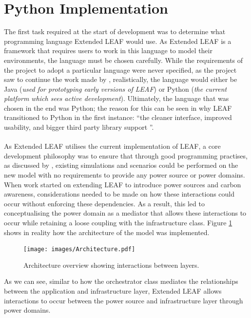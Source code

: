 \documentclass{l4proj}
\begin{document}
\section{Python Implementation}\label{sec:python}
The first task required at the start of development was to determine what programming language Extended LEAF would use.
As Extended LEAF is a framework that requires users to work in this language to model their environments, the language must be chosen carefully.
While the requirements of the project to adopt a particular language were never specified, as the project saw to continue the work made by \cite{leaf2021}, realistically, the language would either be Java (\textit{used for prototyping early versions of LEAF}) or Python (\textit{the current platform which sees active development}).
Ultimately, the language that was chosen in the end was Python; the reason for this can be seen in why LEAF transitioned to Python in the first instance: ``the cleaner interface, improved usability, and bigger third party library support \citep{leaf-java-git}''.\\ \\
As Extended LEAF utilises the current implementation of LEAF, a core development philosophy was to ensure that through good programming practises, as discussed by \citep{looseCoupling}, existing simulations and scenarios could be performed on the new model with no requirements to provide any power source or power domains.
When work started on extending LEAF to introduce power sources and carbon awareness, considerations needed to be made on how these interactions could occur without enforcing these dependencies.
As a result, this led to conceptualising the power domain as a mediator that allows these interactions to occur while retaining a loose coupling with the infrastructure class.
Figure \ref{fig:archtecture} shows in reality how the architecture of the model was implemented.

\begin{figure}[h]
    \centering
    \texttt{[image: images/Architecture.pdf]}
    ~
    \caption{Architecture overview showing interactions between layers.}
    \label{fig:archtecture}
\end{figure}

As we can see, similar to how the orchestrator class mediates the relationships between the application and infrastructure layer, Extended LEAF allows interactions to occur between the power source and infrastructure layer through power domains.
\end{document}
